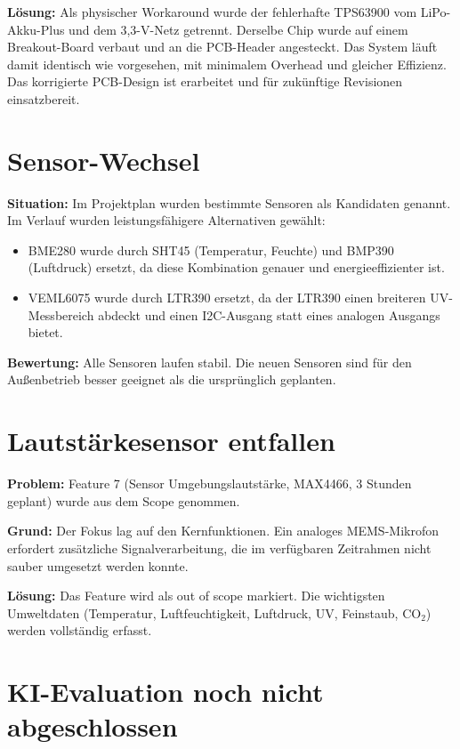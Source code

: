 \textbf{Lösung:} Als physischer Workaround wurde der fehlerhafte TPS63900 vom LiPo-Akku-Plus und dem 3,3-V-Netz getrennt. Derselbe Chip wurde auf einem Breakout-Board verbaut und an die PCB-Header angesteckt. Das System läuft damit identisch wie vorgesehen, mit minimalem Overhead und gleicher Effizienz. Das korrigierte PCB-Design ist erarbeitet und für zukünftige Revisionen einsatzbereit.

\section*{Sensor-Wechsel}

\textbf{Situation:} Im Projektplan wurden bestimmte Sensoren als Kandidaten genannt. Im Verlauf wurden leistungsfähigere Alternativen gewählt:

\begin{itemize}
  \item BME280 wurde durch SHT45 (Temperatur, Feuchte) und BMP390 (Luftdruck) ersetzt, da diese Kombination genauer und energieeffizienter ist.
  \item VEML6075 wurde durch LTR390 ersetzt, da der LTR390 einen breiteren UV-Messbereich abdeckt und einen I2C-Ausgang statt eines analogen Ausgangs bietet.
\end{itemize}

\textbf{Bewertung:} Alle Sensoren laufen stabil. Die neuen Sensoren sind für den Außenbetrieb besser geeignet als die ursprünglich geplanten.

\section*{Lautstärkesensor entfallen}

\textbf{Problem:} Feature 7 (Sensor Umgebungslautstärke, MAX4466, 3 Stunden geplant) wurde aus dem Scope genommen.

\textbf{Grund:} Der Fokus lag auf den Kernfunktionen. Ein analoges MEMS-Mikrofon erfordert zusätzliche Signalverarbeitung, die im verfügbaren Zeitrahmen nicht sauber umgesetzt werden konnte.

\textbf{Lösung:} Das Feature wird als \glqq out of scope\grqq{} markiert. Die wichtigsten Umweltdaten (Temperatur, Luftfeuchtigkeit, Luftdruck, UV, Feinstaub, CO${}_2$) werden vollständig erfasst.

\section*{KI-Evaluation noch nicht abgeschlossen}

